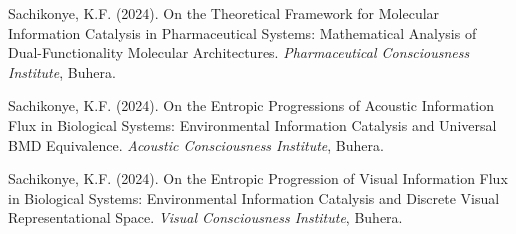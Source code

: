 \documentclass[12pt,a4paper]{article}
\theoremstyle{remark}
\begin{document}
\begin{thebibliography}{99}
Sachikonye, K.F. (2024). On the Theoretical Framework for Molecular Information Catalysis in Pharmaceutical Systems: Mathematical Analysis of Dual-Functionality Molecular Architectures. \textit{Pharmaceutical Consciousness Institute}, Buhera.

Sachikonye, K.F. (2024). On the Entropic Progressions of Acoustic Information Flux in Biological Systems: Environmental Information Catalysis and Universal BMD Equivalence. \textit{Acoustic Consciousness Institute}, Buhera.

Sachikonye, K.F. (2024). On the Entropic Progression of Visual Information Flux in Biological Systems: Environmental Information Catalysis and Discrete Visual Representational Space. \textit{Visual Consciousness Institute}, Buhera.

\end{thebibliography}
\end{document}
